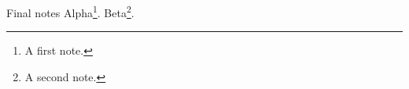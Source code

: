 \documentclass{beamer}
\begin{document}
\begin{frame}[allowframebreaks]{Final notes}
Alpha\footnote{A first note.}.\newpage
Beta\footnote{A second note.}.
\end{frame}
\end{document}

